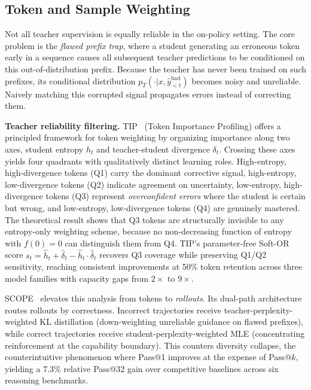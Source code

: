 \documentclass{article} %
\newcommand{\pteacher}{p_T}
\begin{document}
\subsection{Token and Sample Weighting}
\label{subsec:weighting}

Not all teacher supervision is equally reliable in the on-policy setting. The core problem is the \emph{flawed prefix trap}, where a student generating an erroneous token early in a sequence causes all subsequent teacher predictions to be conditioned on this out-of-distribution prefix. Because the teacher has never been trained on such prefixes, its conditional distribution $\pteacher(\cdot|x, \hat{y}_{<t}^{\text{bad}})$ becomes noisy and unreliable. Naively matching this corrupted signal propagates errors instead of correcting them.

\textbf{Teacher reliability filtering.} TIP~\citep{xu2026tip} (Token Importance Profiling) offers a principled framework for token weighting by organizing importance along two axes, student entropy $h_t$ and teacher-student divergence $\delta_t$. Crossing these axes yields four quadrants with qualitatively distinct learning roles. High-entropy, high-divergence tokens (Q1) carry the dominant corrective signal, high-entropy, low-divergence tokens (Q2) indicate agreement on uncertainty, low-entropy, high-divergence tokens (Q3) represent \emph{overconfident errors} where the student is certain but wrong, and low-entropy, low-divergence tokens (Q4) are genuinely mastered. The theoretical result shows that Q3 tokens are structurally invisible to any entropy-only weighting scheme, because no non-decreasing function of entropy with $f(0)=0$ can distinguish them from Q4. TIP's parameter-free Soft-OR score $s_t = \hat{h}_t + \hat{\delta}_t - \hat{h}_t \cdot \hat{\delta}_t$ recovers Q3 coverage while preserving Q1/Q2 sensitivity, reaching consistent improvements at 50\% token retention across three model families with capacity gaps from $2\times$ to $9\times$.

SCOPE~\citep{zheng2026scope} elevates this analysis from tokens to \emph{rollouts}. Its dual-path architecture routes rollouts by correctness. Incorrect trajectories receive teacher-perplexity-weighted KL distillation (down-weighting unreliable guidance on flawed prefixes), while correct trajectories receive student-perplexity-weighted MLE (concentrating reinforcement at the capability boundary). This counters diversity collapse, the counterintuitive phenomenon where Pass@1 improves at the expense of Pass@$k$, yielding a 7.3\% relative Pass@32 gain over competitive baselines across six reasoning benchmarks.
\end{document}
